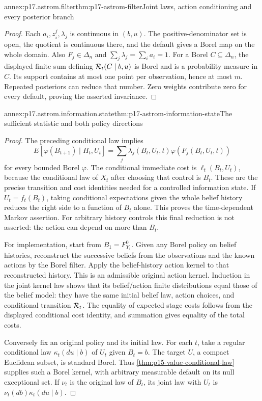 \begin{annexitem}{annex:p17.astrom.filter}{thm:p17-astrom-filter}{Joint laws, action conditioning and every posterior branch}
\begin{proof}
Each \(a_i,z_i^j,\lambda_j\) is continuous in \((b,u)\).
The positive-denominator set is open, the quotient is
continuous there, and the default gives a Borel map
on the whole domain. Also \(F_j\in\Delta_n\) and
\(\sum_j\lambda_j=\sum_i a_i=1\).
For a Borel \(C\subseteq\Delta_n\), the displayed finite
sum defining \({\cal R}_t(C\mid b,u)\) is Borel and
is a probability measure in \(C\). Its support contains
at most one point per observation, hence at most \(m\).
Repeated posteriors can reduce that number.
Zero weights contribute zero for every default, proving
the asserted invariance.
\end{proof}
\end{annexitem}

\begin{annexitem}{annex:p17.astrom.information.state}{thm:p17-astrom-information-state}{The sufficient statistic and both policy directions}
\begin{proof}
The preceding conditional law implies
\[
 E[\varphi(B_{t+1})\mid H_t,U_t]
       =\sum_j\lambda_j(B_t,U_t,t)
                                \varphi(F_j(B_t,U_t,t))
\]
for every bounded Borel \(\varphi\).
The conditional immediate cost is
\(\ell_t(B_t,U_t)\), because the conditional law of
\(X_t\) after choosing that control is \(B_t\).
These are the precise transition and cost identities
needed for a controlled information state.
If \(U_t=f_t(B_t)\), taking conditional expectations
given the whole belief history reduces the right side
to a function of \(B_t\) alone. This proves the
time-dependent Markov assertion.
For arbitrary history controls this final reduction is
not asserted: the action can depend on more than \(B_t\).

For implementation, start from \(B_1=F^0_{Y_1}\).
Given any Borel policy on belief histories, reconstruct
the successive beliefs from the observations and the
known actions by the Borel filter. Apply the belief-history
action kernel to that reconstructed history. This is
an admissible original action kernel. Induction in the
joint kernel law shows that its belief/action finite
distributions equal those of the belief model: they
have the same initial belief law, action choices, and
conditional transition \({\cal R}_t\).
The equality of expected stage costs follows from
the displayed conditional cost identity, and summation
gives equality of the total costs.

Conversely fix an original policy and its initial law.
For each \(t\), take a regular conditional law
\(\kappa_t(du\mid b)\) of \(U_t\) given \(B_t=b\).
The target \(U\), a compact Euclidean subset, is standard
Borel. Thus \cref{thm:p15-value-conditional-law} supplies
such a Borel kernel, with arbitrary measurable default
on its null exceptional set. If \(\nu_t\) is the
original law of \(B_t\), its joint law with \(U_t\)
is \(\nu_t(db)\kappa_t(du\mid b)\).


\end{proof}
\end{annexitem}
